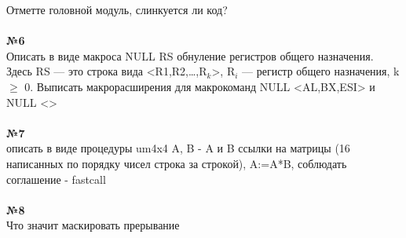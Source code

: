 \documentclass[a4paper,10pt]{article}
\begin{document}
Отметте головной модуль, слинкуется ли код? \\
\vspace{0.3cm} \\
\textbf{№6} \\
Описать в виде макроса NULL RS обнуление регистров общего назначения. Здесь RS — это строка вида <R1,R2,…,R$_k$>, R$_i$ — регистр общего назначения, k $\ge$ 0. Выписать макрорасширения для макрокоманд NULL <AL,BX,ESI> и NULL <> \\
\vspace{0.3cm} \\
\textbf{№7} \\
описать в виде процедуры um4x4 A, B - A и B ссылки на матрицы (16 написанных по порядку чисел строка за строкой), A:=A*B, соблюдать соглашение - fastcall\\
\vspace{0.3cm} \\
\textbf{№8} \\
Что значит маскировать прерывание
\end{document}
